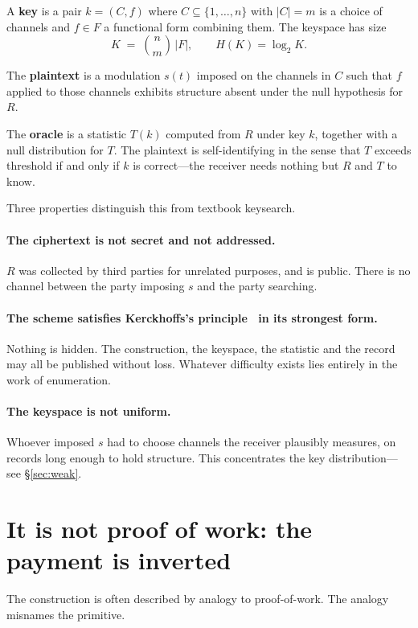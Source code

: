 A \textbf{key} is a pair $k=(C,f)$ where $C\subseteq\{1,\dots,n\}$ with $|C|=m$
is a choice of channels and $f\in F$ a functional form combining them. The
keyspace has size
\[
  K \;=\; \binom{n}{m}\,|F|, \qquad H(K)=\log_2 K .
\]

The \textbf{plaintext} is a modulation $s(t)$ imposed on the channels in $C$ such
that $f$ applied to those channels exhibits structure absent under the null
hypothesis for $R$.

The \textbf{oracle} is a statistic $T(k)$ computed from $R$ under key $k$,
together with a null distribution for $T$. The plaintext is self-identifying in
the sense that $T$ exceeds threshold if and only if $k$ is correct---the receiver
needs nothing but $R$ and $T$ to know.

Three properties distinguish this from textbook keysearch.

\paragraph{The ciphertext is not secret and not addressed.} $R$ was collected by
third parties for unrelated purposes, and is public. There is no channel between
the party imposing $s$ and the party searching.

\paragraph{The scheme satisfies Kerckhoffs's principle~\cite{kerckhoffs} in its
strongest form.} Nothing is hidden. The construction, the keyspace, the statistic
and the record may all be published without loss. Whatever difficulty exists lies
entirely in the work of enumeration.

\paragraph{The keyspace is not uniform.} Whoever imposed $s$ had to choose
channels the receiver plausibly measures, on records long enough to hold
structure. This concentrates the key distribution---see \S\ref{sec:weak}.

\section{It is not proof of work: the payment is inverted}\label{sec:notpow}

The construction is often described by analogy to proof-of-work. The analogy
misnames the primitive.

